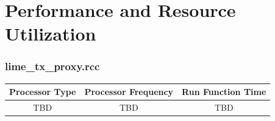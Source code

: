 \documentclass{article}
\def\comp{lime\_tx\_proxy}
\begin{document}
\section*{Performance and Resource Utilization}
\subsubsection*{\comp.rcc}
\begin{scriptsize}
	\begin{tabular}{|c|c|c|}
		\hline
		\rowcolor{blue}
		Processor Type & Processor Frequency & Run Function Time \\
		\hline
		TBD            & TBD                 & TBD               \\
		\hline
	\end{tabular}
\end{scriptsize}
\end{document}
